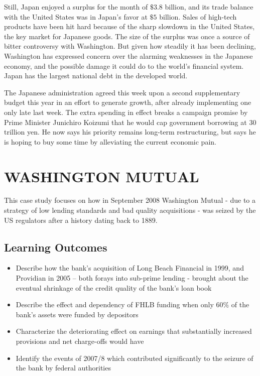 \documentclass[]{article}
\begin{document}
Still, Japan enjoyed a surplus for the month of $\$3.8$ billion, and its trade balance with the United States was in Japan's favor at $\$5$ billion. Sales of high-tech products have been hit hard because of the sharp slowdown in the United States, the key market for Japanese goods.
The size of the surplus was once a source of bitter controversy with Washington. But given how steadily it has been declining, Washington has expressed concern over the alarming weaknesses in the Japanese economy, and the possible damage it could do to the world's financial system. Japan has the largest national debt in the developed world.
 
The Japanese administration agreed this week upon a second supplementary budget this year in an effort to generate growth, after already implementing one only late last week. The extra spending in effect breaks a campaign promise by Prime Minister Junichiro Koizumi that he would cap government borrowing at 30 trillion yen. He now says his priority remains long-term restructuring, but says he is hoping to buy some time by alleviating the current economic pain.
 

\newpage
\section{WASHINGTON MUTUAL}
This case study focuses on how in September 2008 Washington Mutual - due to a strategy of low lending standards
and bad quality acquisitions - was seized by the US regulators after a history dating back to 1889.

\subsection{Learning Outcomes}

\begin{itemize}
\item Describe how the bank’s acquisition of Long Beach Financial in 1999, and
Providian in 2005 – both forays into sub-prime lending - brought about the
eventual shrinkage of the credit quality of the bank’s loan book
\item Describe the effect and dependency of FHLB funding when only $60\%$ of the
bank’s assets were funded by depositors
\item Characterize the deteriorating effect on earnings that substantially
increased provisions and net charge-offs would have
\item Identify the events of 2007/8 which contributed significantly to the seizure
of the bank by federal authorities
\end{itemize}
\end{document}
